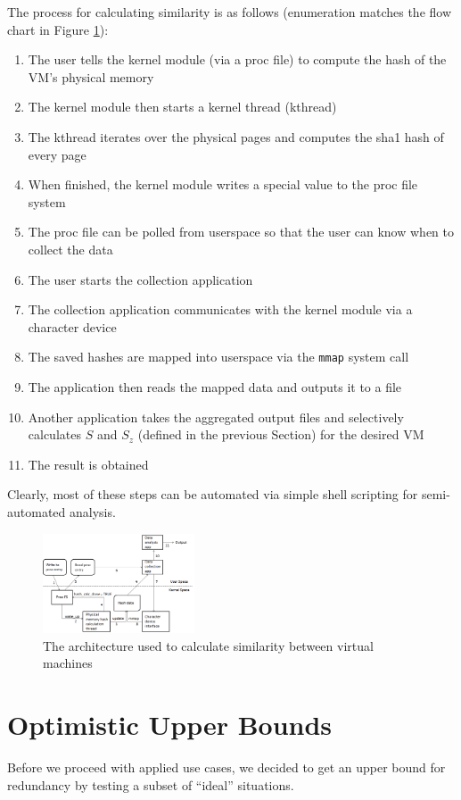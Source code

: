 \documentclass{acm_proc_article-sp}
\begin{document}
The process for calculating similarity is as follows (enumeration matches the flow chart in Figure \ref{fig:flow}):
\begin{enumerate}
  \item The user tells the kernel module (via a proc file)  to compute the hash of the VM's physical memory
  \item The kernel module then starts a kernel thread (kthread)
  \item The kthread iterates over the physical pages and computes the sha1 hash of every page
  \item When finished, the kernel module writes a special value to the proc file system
  \item The proc file can be polled from userspace so that the user can know when to collect the data
  \item The user starts the collection application
  \item The collection application communicates with the kernel module via a character device
  \item The saved hashes are mapped into userspace via the {\tt mmap} system call
  \item The application then reads the mapped data and outputs it to a file
  \item Another application takes the aggregated output files and selectively calculates $S$ and $S_z$ (defined in the previous Section) for the desired VM
  \item The result is obtained
\end{enumerate}
Clearly, most of these steps can be automated via simple shell scripting for semi-automated analysis.

\begin{figure}
  \centering
  \includegraphics[width=0.4\textwidth]{images/architecture.png}
  \caption{The architecture used to calculate similarity between virtual machines}\label{fig:flow}
\end{figure}

\section{Optimistic Upper Bounds}
Before we proceed with applied use cases, we decided to get an upper bound for redundancy by testing a subset of ``ideal'' situations.
\end{document}
